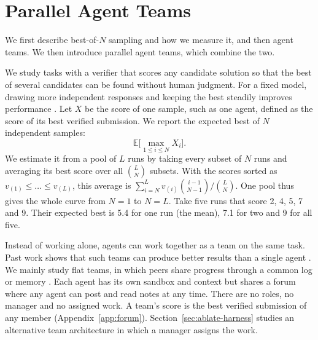\documentclass[numbers,10pt]{arxiv}
\renewcommand{\paragraph}[1]{\sansbf{#1}}
\begin{document}
\section{Parallel Agent Teams}
\label{sec:setup}

We first describe best-of-$N$ sampling and how we measure it, and then agent teams. We then introduce parallel agent teams, which combine the two.

\paragraph{Best-of-\texorpdfstring{$N$}{N} sampling.} \label{sec:premise} We study tasks with a verifier that scores any candidate solution so that the best of several candidates can be found without human judgment. For a fixed model, drawing more independent responses and keeping the best steadily improves performance \citep{brown2024monkeys}. Let $X$ be the score of one sample, such as one agent, defined as the score of its best verified submission. We report the expected best of $N$ independent samples:
\begin{equation}
\mathbb{E}\Big[\max_{1\le i\le N} X_i\Big].
\label{eq:bestofn}
\end{equation}
We estimate it from a pool of $L$ runs by taking every subset of $N$ runs and averaging its best score over all $\binom{L}{N}$ subsets. With the scores sorted as $v_{(1)}\le\dots\le v_{(L)}$, this average is $\sum_{i=N}^{L} v_{(i)}\binom{i-1}{N-1}/\binom{L}{N}$. One pool thus gives the whole curve from $N=1$ to $N=L$. Take five runs that score 2, 4, 5, 7 and 9. Their expected best is 5.4 for one run (the mean), 7.1 for two and 9 for all five.

\paragraph{Agent teams.} \label{sec:setup-team} Instead of working alone, agents can work together as a team on the same task. Past work shows that such teams can produce better results than a single agent \citep{li2023camel,du2024debate,hong2024metagpt,qian2024chatdev,chen2024agentverse}. We mainly study flat teams, in which peers share progress through a common log or memory \citep{park2026communication,qu2026coral}. Each agent has its own sandbox and context but shares a forum where any agent can post and read notes at any time. There are no roles, no manager and no assigned work. A team's score is the best verified submission of any member (Appendix~\ref{app:forum}). Section~\ref{sec:ablate-harness} studies an alternative team architecture in which a manager assigns the work.
\end{document}
